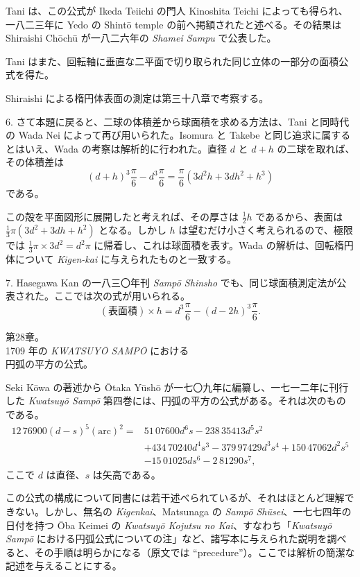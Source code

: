 \documentclass[11pt]{article}
\newcommand{\scanpage}[2]{\clearpage\setcounter{footnote}{0}\noindent{\footnotesize\color{gray}PDF #1 頁 · #2}\par\medskip}
\newcommand{\scanfooter}{}
\begin{document}
Tani は、この公式が Ikeda Teiichi の門人 Kinoshita Teichi によっても得られ、一八二三年に Yedo の Shintō temple の前へ掲額されたと述べる。その結果は Shiraishi Chōchū が一八二六年の \emph{Shamei Sampu} で公表した。

Tani はまた、回転軸に垂直な二平面で切り取られた同じ立体の一部分の面積公式を得た。

Shiraishi による楕円体表面の測定は第三十八章で考察する。

6. さて本題に戻ると、二球の体積差から球面積を求める方法は、Tani と同時代の Wada Nei によって再び用いられた。Isomura と Takebe と同じ追求に属するとはいえ、Wada の考察は解析的に行われた。直径 $d$ と $d+h$ の二球を取れば、その体積差は
\[
(d+h)^3\frac\pi6-d^3\frac\pi6=\frac\pi6(3d^2h+3dh^2+h^3)
\]
である。

この殻を平面図形に展開したと考えれば、その厚さは $\frac12h$ であるから、表面は $\frac13\pi(3d^2+3dh+h^2)$ となる。しかし $h$ は望むだけ小さく考えられるので、極限では $\frac13\pi\times3d^2=d^2\pi$ に帰着し、これは球面積を表す。Wada の解析は、回転楕円体について \emph{Kigen-kai} に与えられたものと一致する。

7. Hasegawa Kan の一八三〇年刊 \emph{Sampō Shinsho} でも、同じ球面積測定法が公表された。ここでは次の式が用いられる。
\[
(\text{表面積})\times h=d^3\frac\pi6-(d-2h)^3\frac\pi6.
\]
\scanfooter


\scanpage{0224}{第28章冒頭、印刷頁210}
\begin{center}
第28章。\\[1mm]
1709 年の \emph{KWATSUYŌ SAMPŌ} における\\
円弧の平方の公式。
\end{center}

Seki Kōwa の著述から Ōtaka Yūshō が一七〇九年に編纂し、一七一二年に刊行した \emph{Kwatsuyō Sampō} 第四巻には、円弧の平方の公式がある。それは次のものである。
\[
\begin{aligned}
12\,76900(d-s)^5(\mathrm{arc})^2={}&51\,07600d^6s-238\,35413d^5s^2\\
&+434\,70240d^4s^3-379\,97429d^3s^4+150\,47062d^2s^5\\
&-15\,01025ds^6-2\,81290s^7,
\end{aligned}
\]
ここで $d$ は直径、$s$ は矢高である。

この公式の構成について同書には若干述べられているが、それはほとんど理解できない。しかし、無名の \emph{Kigenkai}、Matsunaga の \emph{Sampō Shūsei}、一七七四年の日付を持つ Ōba Keimei の \emph{Kwatsuyō Kojutsu no Kai}、すなわち「\emph{Kwatsuyō Sampō} における円弧公式についての注」など、諸写本に与えられた説明を調べると、その手順は明らかになる（原文では ``precedure''）。ここでは解析の簡潔な記述を与えることにする。
\end{document}
